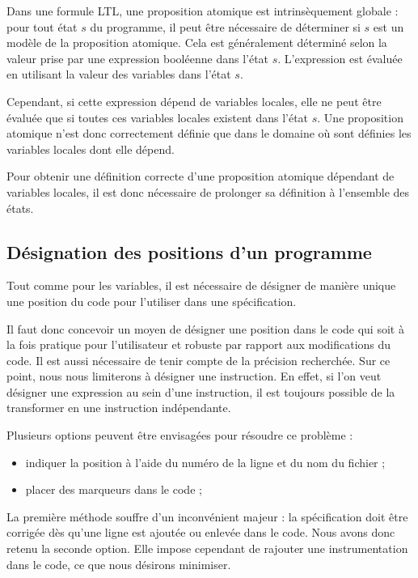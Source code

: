 Dans une formule LTL, une proposition atomique est intrinsèquement globale :
pour tout état \(s\) du programme, il peut être nécessaire de déterminer si
\(s\) est un modèle de la proposition atomique. Cela est généralement déterminé
selon la valeur prise par une expression booléenne dans l'état \(s\).
L'expression est évaluée en utilisant la valeur des variables dans l'état \(s\).

Cependant, si cette expression dépend de variables locales, elle ne peut être
évaluée que si toutes ces variables locales existent dans l'état \(s\). Une
proposition atomique n'est donc correctement définie que dans le domaine où sont
définies les variables locales dont elle dépend.

Pour obtenir une définition correcte d'une proposition atomique dépendant de
variables locales, il est donc nécessaire de prolonger sa définition à
l'ensemble des états.

\subsection{Désignation des positions d'un programme}

Tout comme pour les variables, il est nécessaire de désigner de manière unique
une position du code pour l'utiliser dans une spécification.

Il faut donc concevoir un moyen de désigner une position dans le code qui soit
à la fois pratique pour l'utilisateur et robuste par rapport aux modifications du
code.
Il est aussi nécessaire de tenir compte de la précision recherchée. Sur ce
point, nous nous limiterons à désigner une instruction. En effet, si l'on veut
désigner une expression au sein d'une instruction, il est toujours possible de
la transformer en une instruction indépendante.

Plusieurs options peuvent être envisagées pour résoudre ce problème :

\begin{itemize}
\item
  indiquer la position à l'aide du numéro de la ligne et du nom du fichier ;
\item
  placer des marqueurs dans le code ;
\end{itemize}

La première méthode souffre d'un inconvénient majeur : la spécification doit
être corrigée dès qu'une ligne est ajoutée ou enlevée dans le code. Nous avons
donc retenu la seconde option. Elle impose cependant de rajouter une
instrumentation dans le code, ce que nous désirons minimiser.

